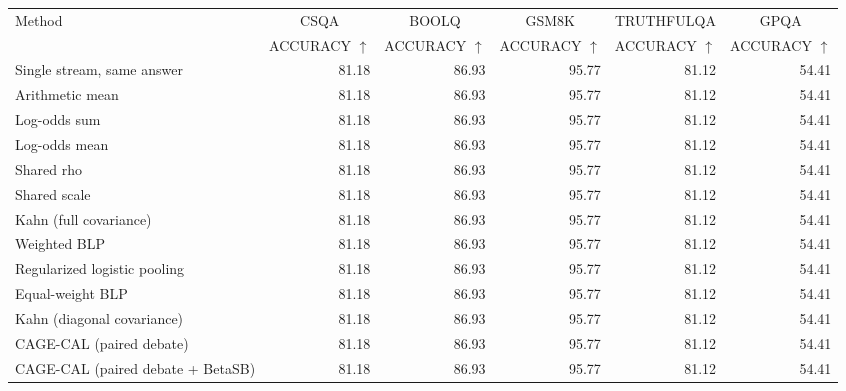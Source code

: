 \begin{tabular}{lrrrrr}
\toprule
Method & \multicolumn{1}{c}{CSQA} & \multicolumn{1}{c}{BOOLQ} & \multicolumn{1}{c}{GSM8K} & \multicolumn{1}{c}{TRUTHFULQA} & \multicolumn{1}{c}{GPQA} \\
 & ACCURACY $\uparrow$ & ACCURACY $\uparrow$ & ACCURACY $\uparrow$ & ACCURACY $\uparrow$ & ACCURACY $\uparrow$ \\
\midrule
Single stream, same answer & 81.18 & 86.93 & 95.77 & 81.12 & 54.41 \\
Arithmetic mean & 81.18 & 86.93 & 95.77 & 81.12 & 54.41 \\
Log-odds sum & 81.18 & 86.93 & 95.77 & 81.12 & 54.41 \\
Log-odds mean & 81.18 & 86.93 & 95.77 & 81.12 & 54.41 \\
Shared rho & 81.18 & 86.93 & 95.77 & 81.12 & 54.41 \\
Shared scale & 81.18 & 86.93 & 95.77 & 81.12 & 54.41 \\
Kahn (full covariance) & 81.18 & 86.93 & 95.77 & 81.12 & 54.41 \\
Weighted BLP & 81.18 & 86.93 & 95.77 & 81.12 & 54.41 \\
Regularized logistic pooling & 81.18 & 86.93 & 95.77 & 81.12 & 54.41 \\
Equal-weight BLP & 81.18 & 86.93 & 95.77 & 81.12 & 54.41 \\
Kahn (diagonal covariance) & 81.18 & 86.93 & 95.77 & 81.12 & 54.41 \\
CAGE-CAL (paired debate) & 81.18 & 86.93 & 95.77 & 81.12 & 54.41 \\
CAGE-CAL (paired debate + BetaSB) & 81.18 & 86.93 & 95.77 & 81.12 & 54.41 \\
\bottomrule
\end{tabular}
